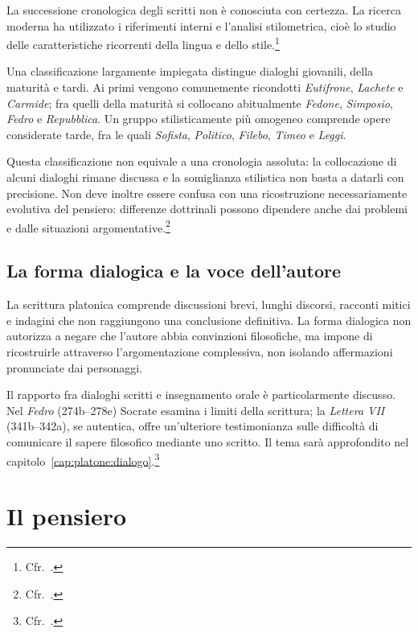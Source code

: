 La successione cronologica degli scritti non è conosciuta con certezza. La ricerca moderna ha utilizzato i riferimenti interni e l'analisi stilometrica, cioè lo studio delle caratteristiche ricorrenti della lingua e dello stile.\footnote{Cfr.\ \cite[106--108]{palumbo2015}.}

Una classificazione largamente impiegata distingue dialoghi giovanili, della maturità e tardi. Ai primi vengono comunemente ricondotti \emph{Eutifrone}, \emph{Lachete} e \emph{Carmide}; fra quelli della maturità si collocano abitualmente \emph{Fedone}, \emph{Simposio}, \emph{Fedro} e \emph{Repubblica}. Un gruppo stilisticamente più omogeneo comprende opere considerate tarde, fra le quali \emph{Sofista}, \emph{Politico}, \emph{Filebo}, \emph{Timeo} e \emph{Leggi}.

Questa classificazione non equivale a una cronologia assoluta: la collocazione di alcuni dialoghi rimane discussa e la somiglianza stilistica non basta a datarli con precisione. Non deve inoltre essere confusa con una ricostruzione necessariamente evolutiva del pensiero: differenze dottrinali possono dipendere anche dai problemi e dalle situazioni argomentative.\footnote{Cfr.\ \cite[106--110]{palumbo2015}.}

\subsection{La forma dialogica e la voce dell'autore}

La scrittura platonica comprende discussioni brevi, lunghi discorsi, racconti mitici e indagini che non raggiungono una conclusione definitiva. La forma dialogica non autorizza a negare che l'autore abbia convinzioni filosofiche, ma impone di ricostruirle attraverso l'argomentazione complessiva, non isolando affermazioni pronunciate dai personaggi.

Il rapporto fra dialoghi scritti e insegnamento orale è particolarmente discusso. Nel \emph{Fedro} (274b--278e) Socrate esamina i limiti della scrittura; la \emph{Lettera VII} (341b--342a), se autentica, offre un'ulteriore testimonianza sulle difficoltà di comunicare il sapere filosofico mediante uno scritto. Il tema sarà approfondito nel capitolo~\ref{cap:platone:dialogo}.\footnote{Cfr.\ \cite[108--110]{palumbo2015}.}

\section{Il pensiero}

